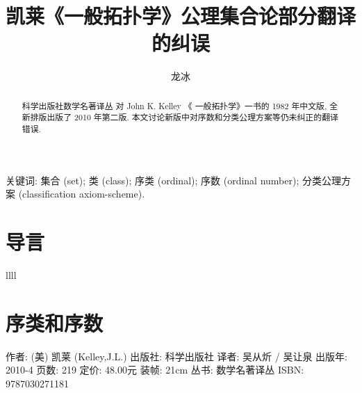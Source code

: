 \documentclass[zihao=-4,heading=true,a4paper]{ctexart}
\title{凯莱《一般拓扑学》公理集合论部分翻译的纠误}
\author{龙\quad 冰}
\date{}
\begin{document}
\maketitle
\begin{abstract}
科学出版社数学名著译丛 对 John K. Kelley 《 一般拓扑学》一书的 1982 年中文版, 全新排版出版了 2010 年第二版.
本文讨论新版中对序数和分类公理方案等仍未纠正的翻译错误.
\end{abstract}

关键词: 集合 (set); 类 (class); 序类 (ordinal); 
序数 (ordinal number); 
分类公理方案 (classification axiom-scheme).



\section{导言}
llll

\section{序类和序数 }



作者: (美) 凯莱 (Kelley,J.L.)
出版社: 科学出版社
译者: 吴从炘 / 吴让泉 
出版年: 2010-4
页数: 219
定价: 48.00元
装帧: 21cm
丛书: 数学名著译丛
ISBN: 9787030271181
\end{document}
